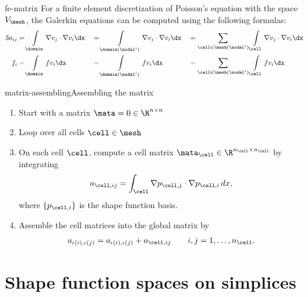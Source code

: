 \begin{Lemma}{fe-matrix}
  For a finite element discretization of Poisson's equation with the
  space $V_\mesh$, the Galerkin equations can be computed using the
  following formulas:
  \begin{alignat*}3
    a_{ij} &= \int\limits_\domain \nabla v_j \cdot \nabla v_i \dx
    &&= \int\limits_{\domain(\nodal^i)} \nabla v_j \cdot \nabla v_i \dx
    &&= \sum_{\cell\in\mesh(\nodal^i)}\int\limits_\cell \nabla v_j \cdot \nabla v_i \dx\\
    f_{i} &= \int\limits_\domain f v_i \dx
    &&= \int\limits_{\domain(\nodal^i)} f v_i \dx
    &&= \sum_{\cell\in\mesh(\nodal^i)}\int\limits_\cell f v_i \dx
  \end{alignat*}
\end{Lemma}

\begin{Algorithm*}{matrix-assembling}{Assembling the matrix}
  \begin{enumerate}
  \item Start with a matrix $\mata = 0 \in \R^{n\times n}$
  \item Loop over all cells $\cell\in\mesh$
  \item On each cell $\cell$, compute a cell matrix
    $\mata_\cell \in \R^{n_\cell\times n_\cell}$ by integrating
    \begin{gather}
      a_{\cell,ij} = \int_\cell \nabla p_{\cell,j}\cdot\nabla p_{\cell,i}\,dx,
    \end{gather}
    where $\{p_{\cell,i}\}$ is the shape function basis.
  \item Assemble the cell matrices into the global matrix by
    \begin{gather}
      a_{\iota(i),\iota(j)} = a_{\iota(i),\iota(j)} + a_{\cell,ij}
      \qquad i,j = 1,\dots,n_\cell.
    \end{gather}
  \end{enumerate}
\end{Algorithm*}



\section{Shape function spaces on simplices}

